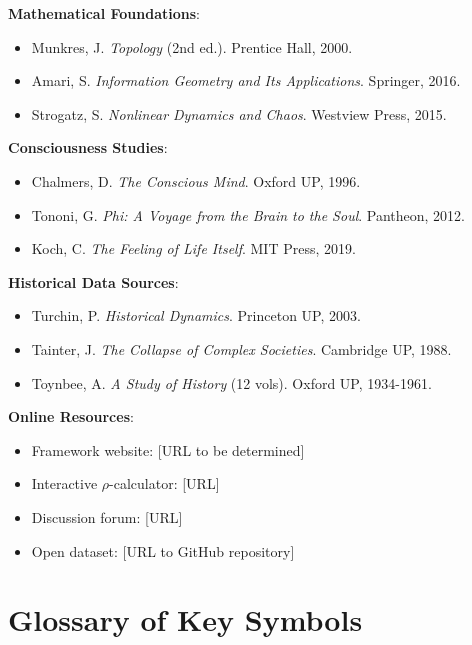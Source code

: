 \documentclass[11pt,a4paper]{article}
\theoremstyle{definition}
\theoremstyle{remark}
\begin{document}
\begin{enumerate}
\begin{protocol}
\textbf{Mathematical Foundations}:
\begin{itemize}
    \item Munkres, J. \textit{Topology} (2nd ed.). Prentice Hall, 2000.
    \item Amari, S. \textit{Information Geometry and Its Applications}. Springer, 2016.
    \item Strogatz, S. \textit{Nonlinear Dynamics and Chaos}. Westview Press, 2015.
\end{itemize}

\textbf{Consciousness Studies}:
\begin{itemize}
    \item Chalmers, D. \textit{The Conscious Mind}. Oxford UP, 1996.
    \item Tononi, G. \textit{Phi: A Voyage from the Brain to the Soul}. Pantheon, 2012.
    \item Koch, C. \textit{The Feeling of Life Itself}. MIT Press, 2019.
\end{itemize}

\textbf{Historical Data Sources}:
\begin{itemize}
    \item Turchin, P. \textit{Historical Dynamics}. Princeton UP, 2003.
    \item Tainter, J. \textit{The Collapse of Complex Societies}. Cambridge UP, 1988.
    \item Toynbee, A. \textit{A Study of History} (12 vols). Oxford UP, 1934-1961.
\end{itemize}

\textbf{Online Resources}:
\begin{itemize}
    \item Framework website: [URL to be determined]
    \item Interactive \(\rho\)-calculator: [URL]
    \item Discussion forum: [URL]
    \item Open dataset: [URL to GitHub repository]
\end{itemize}

\vspace{2em}

\section*{Glossary of Key Symbols}


\end{protocol}
\end{enumerate}
\end{document}
